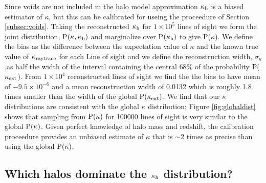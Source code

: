 \documentclass[useAMS,usenatbib]{mn2e}
\begin{document}
Since voids are not included in the halo model approximation $\kappa_{\rm h}$ is a biased estimator of $\kappa$, but this can be calibrated for useing the proceedure of Section \ref{subsec:voids}. Taking the reconstructed $\kappa_{\rm h}$ for $1\times 10^{5}$ lines of sight we form the joint distribution, P$(\kappa,\kappa_{\rm h})$ and marginalize over P$(\kappa_{\rm h})$ to give P($\kappa$). We define the bias as the difference between the expectation value of $\kappa$ and the known true value of $\kappa_{\rm raytrace}$ for each Line of sight and we define the reconstruction width, $\sigma_{\kappa}$,as half the width of the interval containing the central $68\%$ of the probability P($\kappa_{\rm ext}$). From $1\times 10^{4}$ reconstructed lines of sight we find the the bias to have mean of $-9.5\times 10^{-6}$ and a mean reconstruction width of 0.0132 which is roughly 1.8 times smaller than the width of the global P$(\kappa_{\rm ext})$. We find that our $\kappa$ distributions are consistent with the global $\kappa$ distribution; Figure \ref{fig:globaldist} shows that sampling from ${\rm P}(\kappa)$ for 100000 lines of sight is very similar to the global ${\rm P}(\kappa)$. Given perfect knowledge of halo mass and redshift, the calibration proceedure provides an unbiased estimate of $\kappa$ that is $\sim$2 times as precise than using the global ${\rm P}(\kappa)$.

\subsection{Which halos dominate the $\kappa_{\rm h}$ distribution?}
\end{document}
